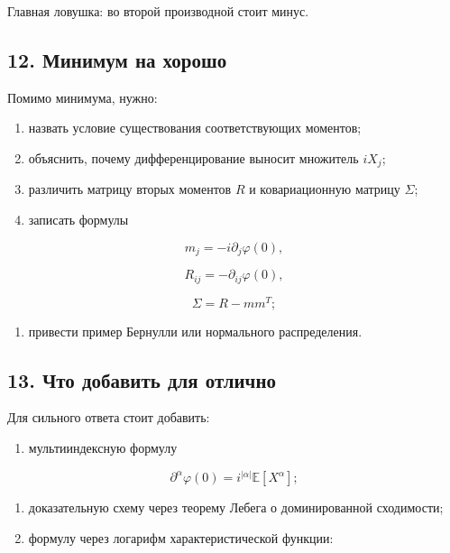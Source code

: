 \documentclass[
  11pt,
  a4paper,
]{article}
\providecommand{\tightlist}{%
  \setlength{\itemsep}{0pt}\setlength{\parskip}{0pt}}
\begin{document}
Главная ловушка: во второй производной стоит минус.

\subsection{12. Минимум на
хорошо}\label{ux43cux438ux43dux438ux43cux443ux43c-ux43dux430-ux445ux43eux440ux43eux448ux43e}

Помимо минимума, нужно:

\begin{enumerate}
\def\labelenumi{\arabic{enumi}.}
\tightlist
\item
  назвать условие существования соответствующих моментов;
\item
  объяснить, почему дифференцирование выносит множитель \(iX_j\);
\item
  различить матрицу вторых моментов \(R\) и ковариационную матрицу
  \(\Sigma\);
\item
  записать формулы
\end{enumerate}

\[
m_j=-i\partial_j\varphi(0),
\]

\[
R_{ij}=-\partial_{ij}\varphi(0),
\]

\[
\Sigma=R-mm^T;
\]

\begin{enumerate}
\def\labelenumi{\arabic{enumi}.}
\setcounter{enumi}{4}
\tightlist
\item
  привести пример Бернулли или нормального распределения.
\end{enumerate}

\subsection{13. Что добавить для
отлично}\label{ux447ux442ux43e-ux434ux43eux431ux430ux432ux438ux442ux44c-ux434ux43bux44f-ux43eux442ux43bux438ux447ux43dux43e}

Для сильного ответа стоит добавить:

\begin{enumerate}
\def\labelenumi{\arabic{enumi}.}
\tightlist
\item
  мультииндексную формулу
\end{enumerate}

\[
\partial^\alpha\varphi(0)
=
i^{|\alpha|}
\mathbb E[X^\alpha];
\]

\begin{enumerate}
\def\labelenumi{\arabic{enumi}.}
\setcounter{enumi}{1}
\tightlist
\item
  доказательную схему через теорему Лебега о доминированной сходимости;
\item
  формулу через логарифм характеристической функции:
\end{enumerate}
\end{document}
